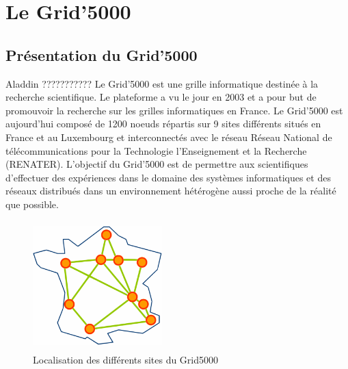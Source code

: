 \documentclass [10pt,a4paper]{report}
\begin{document}
\chapter{Le Grid'5000}
	\section{Présentation du Grid'5000}
	Aladdin ???????????
Le Grid'5000 est une grille informatique destinée à la recherche scientifique. Le plateforme a vu le jour en 2003 et a pour but de promouvoir la recherche sur les grilles informatiques en France. Le Grid'5000 est aujourd'hui composé de 1200 noeuds répartis sur 9 sites différents situés en France et au Luxembourg et interconnectés avec le réseau Réseau National de télécommunications pour la Technologie l'Enseignement et la Recherche (RENATER). L'objectif du Grid'5000 est de permettre aux scientifiques d'effectuer des expériences dans le domaine des systèmes informatiques et des réseaux distribués dans un environnement hétérogène aussi proche de la réalité que possible.

	\begin{figure}[!h]
		\centering
   		\includegraphics[width=5cm,height=5cm]{map.png}
   		\caption{Localisation des différents sites du Grid5000}
    	\label{fig:map}
	\end{figure} 
\end{document}
